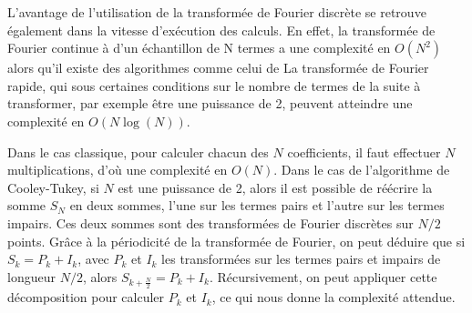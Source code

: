 	L'avantage de l'utilisation de la transformée de Fourier discrète se retrouve également dans la vitesse d'exécution des calculs. En effet, la transformée de Fourier continue à d'un échantillon de N termes a une complexité en $O(N^2)$ alors qu'il existe des algorithmes comme celui de La transformée de Fourier rapide, qui sous certaines conditions sur le nombre de termes de la suite à transformer, par exemple être une puissance de 2, peuvent atteindre une complexité en $O(N\log(N))$. 
	
	Dans le cas classique, pour calculer chacun des $N$ coefficients, il faut effectuer $N$ multiplications, d'où une complexité en $O(N)$.
	Dans le cas de l'algorithme de Cooley-Tukey, si $N$ est une puissance de 2, alors il est possible de réécrire la somme $S_N$ en deux sommes, l'une sur les termes pairs et l'autre sur les termes impairs. Ces deux sommes sont des transformées de Fourier discrètes sur $N/2$ points. Grâce à la périodicité de la transformée de Fourier, on peut déduire que si $S_k = P_k + I_k$, avec $P_k$ et $I_k$ les transformées sur les termes pairs et impairs de longueur $ N/2$, alors $ S_{k+\frac{N}{2}} = P_k + I_k$.  Récursivement, on peut appliquer cette décomposition pour calculer $P_k$ et $I_k$, ce qui nous donne la complexité attendue. 
	
	

